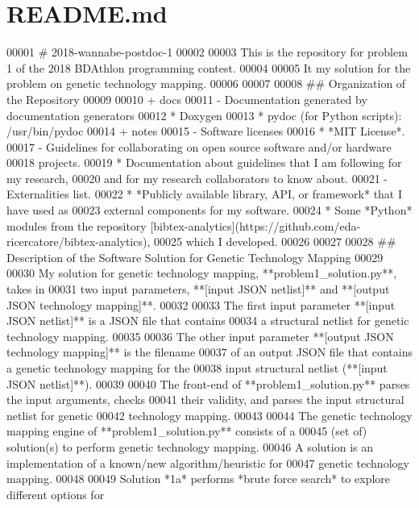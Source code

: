 \hypertarget{README_8md_source}{}\section{R\+E\+A\+D\+M\+E.\+md}

\begin{DoxyCode}
00001 # 2018-wannabe-postdoc-1
00002 
00003 This is the repository for problem 1 of the 2018 BDAthlon programming contest.
00004 
00005 It my solution for the problem on genetic technology mapping.
00006 
00007 
00008 ## Organization of the Repository
00009 
00010 + docs
00011    - Documentation generated by documentation generators
00012        * Doxygen
00013        * pydoc (for Python scripts): /usr/bin/pydoc
00014 + notes
00015    - Software licenses
00016        * *MIT License*.
00017    - Guidelines for collaborating on open source software and/or hardware
00018       projects.
00019     * Documentation about guidelines that I am following for my research,
00020          and for my research collaborators to know about.
00021   - Externalities list.
00022     * *Publicly available library, API, or framework* that I have used as
00023         external components for my software.
00024        * Some *Python* modules from the repository
       [bibtex-analytics](https://github.com/eda-ricercatore/bibtex-analytics),
00025            which I developed.
00026 
00027 
00028 ##  Description of the Software Solution for Genetic Technology Mapping
00029 
00030 My solution for genetic technology mapping, **problem1\_solution.py**, takes in
00031    two input parameters, **[input JSON netlist]** and **[output JSON technology mapping]**.
00032 
00033 The first input parameter **[input JSON netlist]** is a JSON file that contains
00034    a structural netlist for genetic technology mapping.
00035 
00036 The other input parameter **[output JSON technology mapping]** is the filename
00037    of an output JSON file that contains a genetic technology mapping for the
00038    input structural netlist (**[input JSON netlist]**).
00039 
00040 The front-end of **problem1\_solution.py** parses the input arguments, checks
00041    their validity, and parses the input structural netlist for genetic
00042    technology mapping.
00043 
00044 The genetic technology mapping engine of **problem1\_solution.py** consists of a
00045    (set of) solution(s) to perform genetic technology mapping.
00046    A solution is an implementation of a known/new algorithm/heuristic for
00047        genetic technology mapping.
00048 
00049 Solution *1a* performs *brute force search* to explore different options for

\end{DoxyCode}
